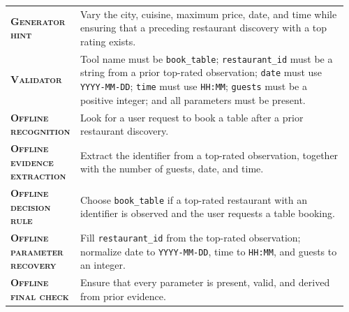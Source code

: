 \begin{table}[htbp]
\centering
\begin{minipage}{0.97\textwidth}
\raggedright
\small
\setlength{\tabcolsep}{3pt}
\renewcommand{\arraystretch}{1.16}
\vspace{0.35em}
\begin{tabular}{@{}>{\raggedright\arraybackslash\bfseries}p{0.17\linewidth} >{\raggedright\arraybackslash}p{0.79\linewidth}@{}}
    \textsc{Generator hint} & Vary the city, cuisine, maximum price, date, and time while ensuring that a preceding restaurant discovery with a top rating exists. \\
    \textsc{Validator} & Tool name must be \texttt{book\_table}; \texttt{restaurant\_id} must be a string from a prior top-rated observation; \texttt{date} must use \texttt{YYYY-MM-DD}; \texttt{time} must use \texttt{HH:MM}; \texttt{guests} must be a positive integer; and all parameters must be present. \\
    \textsc{Offline recognition} & Look for a user request to book a table after a prior restaurant discovery. \\
    \textsc{Offline evidence extraction} & Extract the identifier from a top-rated observation, together with the number of guests, date, and time. \\
    \textsc{Offline decision rule} & Choose \texttt{book\_table} if a top-rated restaurant with an identifier is observed and the user requests a table booking. \\
    \textsc{Offline parameter recovery} & Fill \texttt{restaurant\_id} from the top-rated observation; normalize date to \texttt{YYYY-MM-DD}, time to \texttt{HH:MM}, and guests to an integer. \\
    \textsc{Offline final check} & Ensure that every parameter is present, valid, and derived from prior evidence. \\
\end{tabular}
\vspace{0.45em}
\end{minipage}
\end{table}

